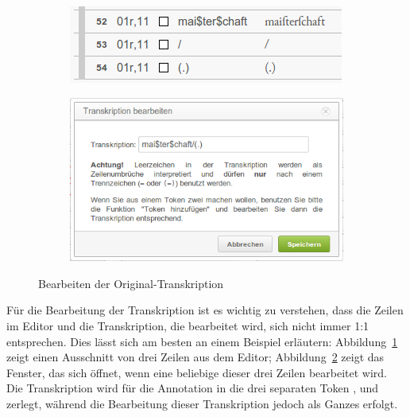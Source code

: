 \documentclass[11pt,a4paper,parskip=half]{scrartcl}
\begin{document}
\begin{figure}
  \centering
  \begin{subfigure}[b]{0.4\textwidth}
    \centering
    \includegraphics[width=\textwidth]{img/trans-bsp1.png}
    \caption{}
    \label{fig:trans-bsp1}
  \end{subfigure}
  \hfill
  \begin{subfigure}[b]{0.5\textwidth}
    \centering
    \includegraphics[width=\textwidth]{img/trans-edit1.png}
    \caption{}
    \label{fig:trans-edit1}
  \end{subfigure}
  \caption{Bearbeiten der Original-Transkription}
  \label{fig:trans-edit}
\end{figure}

Für die Bearbeitung der Transkription ist es wichtig zu verstehen,
dass die Zeilen im Editor und die Transkription, die bearbeitet wird,
sich nicht immer 1:1 entsprechen.  Dies lässt sich am besten an einem
Beispiel erläutern: Abbildung~\ref{fig:trans-bsp1} zeigt einen
Ausschnitt von drei Zeilen aus dem Editor;
Abbildung~\ref{fig:trans-edit1} zeigt das Fenster, das sich öffnet,
wenn eine beliebige dieser drei Zeilen bearbeitet wird.  Die
Transkription  wird für die Annotation in
die drei separaten Token , \trans{/} und
 zerlegt, während die Bearbeitung dieser Transkription
jedoch als Ganzes erfolgt.
\end{document}
